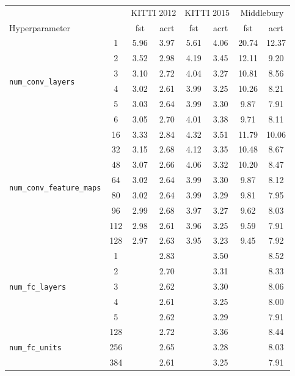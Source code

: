 \documentclass[twoside,11pt]{article}
\begin{document}
\begin{table}[p]
\begin{center}
\begin{tabular}{lc ccc ccc}
\toprule
& & \multicolumn{2}{c}{KITTI 2012} & \multicolumn{2}{c}{KITTI 2015} & \multicolumn{2}{c}{Middlebury} \\
\cmidrule(lr){3-4}
\cmidrule(lr){5-6}
\cmidrule(lr){7-8}
Hyperparameter & & fst & acrt & fst & acrt & fst & acrt\\\midrule

\multirow{6}{*}{\texttt{num\_conv\_layers}}
& 1 & 5.96 & 3.97 & 5.61 & 4.06 & 20.74 & 12.37 \\
& 2 & 3.52 & 2.98 & 4.19 & 3.45 & 12.11 & 9.20 \\
& 3 & 3.10 & 2.72 & 4.04 & 3.27 & 10.81 & 8.56 \\
& 4 & 3.02 & 2.61 & 3.99 & 3.25 & 10.26 & 8.21 \\
& 5 & 3.03 & 2.64 & 3.99 & 3.30 & 9.87 & 7.91 \\
& 6 & 3.05 & 2.70 & 4.01 & 3.38 & 9.71 & 8.11 \\
\midrule
\multirow{8}{*}{\texttt{num\_conv\_feature\_maps}}
& 16 & 3.33 & 2.84 & 4.32 & 3.51 & 11.79 & 10.06 \\
& 32 & 3.15 & 2.68 & 4.12 & 3.35 & 10.48 & 8.67 \\
& 48 & 3.07 & 2.66 & 4.06 & 3.32 & 10.20 & 8.47 \\
& 64 & 3.02 & 2.64 & 3.99 & 3.30 & 9.87 & 8.12 \\
& 80 & 3.02 & 2.64 & 3.99 & 3.29 & 9.81 & 7.95 \\
& 96 & 2.99 & 2.68 & 3.97 & 3.27 & 9.62 & 8.03 \\
& 112 & 2.98 & 2.61 & 3.96 & 3.25 & 9.59 & 7.91 \\
& 128 & 2.97 & 2.63 & 3.95 & 3.23 & 9.45 & 7.92 \\\midrule
\multirow{5}{*}{\texttt{num\_fc\_layers}}
& 1 & & 2.83 & & 3.50 & & 8.52 \\
& 2 & & 2.70 & & 3.31 & & 8.33 \\
& 3 & & 2.62 & & 3.30 & & 8.06 \\
& 4 & & 2.61 & & 3.25 & & 8.00 \\
& 5 & & 2.62 & & 3.29 & & 7.91 \\\midrule
\multirow{4}{*}{\texttt{num\_fc\_units}}
& 128 & & 2.72 & & 3.36 & & 8.44 \\
& 256 & & 2.65 & & 3.28 & & 8.03 \\
& 384 & & 2.61 & & 3.25 & & 7.91 \\

\end{tabular}
\end{center}
\end{table}
\end{document}
